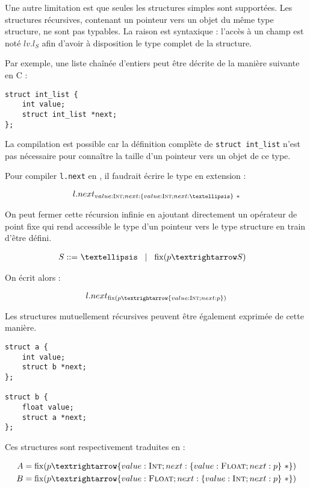 Une autre limitation est que seules les structures simples sont supportées. Les
structures récursives, contenant un pointeur vers un objet du même type
structure, ne sont pas typables. La raison est syntaxique : l'accès à un champ
est noté $lv.l_S$ afin d'avoir à disposition le type complet de la structure.


Par exemple, une liste chaînée d'entiers peut être décrite de la manière
suivante en C :

\begin{verbatim}
struct int_list {
    int value;
    struct int_list *next;
};
\end{verbatim}


La compilation est possible car la définition complète de \texttt{struct
int\_list} n'est pas nécessaire pour connaître la taille d'un pointeur vers un
objet de ce type.

Pour compiler \texttt{l.next} en \langname, il faudrait écrire le type en
extension :

\[
  l.next_{ value:\tInt ; next : \{ value : \tInt ; next : … \}~*}
\]

On peut fermer cette récursion infinie en ajoutant directement un opérateur de
point fixe qui rend accessible le type d'un pointeur vers le type structure en
train d'être défini.

\begin{align*}
    S \gramisa & … \gramorx \mathrm{fix}(p → S)
\end{align*}

On écrit alors :

\[
  l.next_{ \mathrm{fix}(p → \{ value : \tInt ; next : p \}) }
\]

Les structures mutuellement récursives peuvent être également exprimée de cette
manière.

\begin{verbatim}
struct a {
    int value;
    struct b *next;
};

struct b {
    float value;
    struct a *next;
};
\end{verbatim}

Ces structures sont respectivement traduites en :

\begin{align*}
  A &= \mathrm{fix} (p → \{ value : \tInt   ; next : \{ value : \tFloat ; next : p \}~* \}) \\
  B &= \mathrm{fix} (p → \{ value : \tFloat ; next : \{ value : \tInt   ; next : p \}~* \})
\end{align*}

